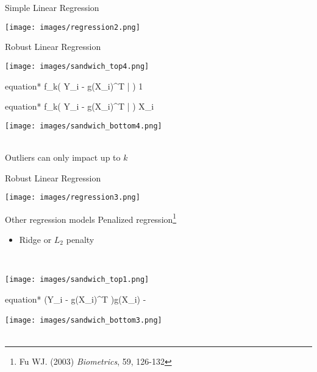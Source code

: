 \documentclass{beamer}
\begin{document}
\begin{frame}{Simple Linear Regression}
	\begin{center}
		\texttt{[image: images/regression2.png]}
	\end{center}
\end{frame}

\begin{frame}{Robust Linear Regression}
	\begin{center}
		\texttt{[image: images/sandwich\_top4.png]}
		\begin{empheq}[box=\wbox]{equation*}
			f_k\left( Y_i - g(X_i)^T \bar{\beta} \right) 1
		\end{empheq}
		\begin{empheq}[box=\wbox]{equation*}
			f_k\left( Y_i - g(X_i)^T \bar{\beta} \right) X_i
		\end{empheq}
		\texttt{[image: images/sandwich\_bottom4.png]}
	\end{center}
	~\\ Outliers can only impact up to $k$
\end{frame}

\begin{frame}{Robust Linear Regression}
	\begin{center}
		\texttt{[image: images/regression3.png]}
	\end{center}
\end{frame}

\begin{frame}{Other regression models}
	Penalized regression\footnote[frame]{Fu WJ. (2003) \textit{Biometrics}, 59, 126-132}
	\begin{itemize}
		\item Ridge or $L_2$ penalty
	\end{itemize}~\\
	\begin{center}
		\texttt{[image: images/sandwich\_top1.png]}
		\begin{empheq}[box=\wbox]{equation*}
			(Y_i - g(X_i)^T \hat{\beta})g(X_i) -  \hat{\beta}
		\end{empheq}
		\texttt{[image: images/sandwich\_bottom3.png]}~\\~\\
	\end{center}
\end{frame}
\end{document}
